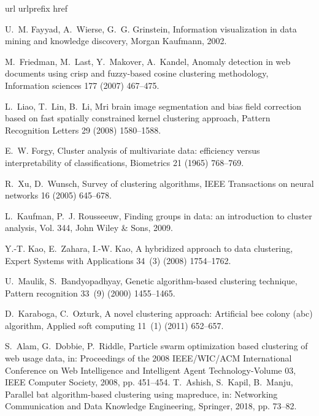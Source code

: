 \documentclass[review]{elsarticle}
\begin{document}

\begin{thebibliography}{10}
\expandafter\ifx\csname url\endcsname\relax
  \def\url#1{\texttt{#1}}\fi
\expandafter\ifx\csname urlprefix\endcsname\relax\def\urlprefix{URL }\fi
\expandafter\ifx\csname href\endcsname\relax
  \def\href#1#2{#2} \def\path#1{#1}\fi

U.~M. Fayyad, A.~Wierse, G.~G. Grinstein, Information visualization in data
  mining and knowledge discovery, Morgan Kaufmann, 2002.

M.~Friedman, M.~Last, Y.~Makover, A.~Kandel, Anomaly detection in web documents
  using crisp and fuzzy-based cosine clustering methodology, Information
  sciences 177 (2007) 467--475.

L.~Liao, T.~Lin, B.~Li, Mri brain image segmentation and bias field correction
  based on fast spatially constrained kernel clustering approach, Pattern
  Recognition Letters 29 (2008) 1580--1588.

E.~W. Forgy, Cluster analysis of multivariate data: efficiency versus
  interpretability of classifications, Biometrics 21 (1965) 768--769.

R.~Xu, D.~Wunsch, Survey of clustering algorithms, IEEE Transactions on neural
  networks 16 (2005) 645--678.

L.~Kaufman, P.~J. Rousseeuw, Finding groups in data: an introduction to cluster
  analysis, Vol. 344, John Wiley \& Sons, 2009.

Y.-T. Kao, E.~Zahara, I.-W. Kao, A hybridized approach to data clustering,
  Expert Systems with Applications 34~(3) (2008) 1754--1762.

U.~Maulik, S.~Bandyopadhyay, Genetic algorithm-based clustering technique,
  Pattern recognition 33~(9) (2000) 1455--1465.

D.~Karaboga, C.~Ozturk, A novel clustering approach: Artificial bee colony
  (abc) algorithm, Applied soft computing 11~(1) (2011) 652--657.

S.~Alam, G.~Dobbie, P.~Riddle, Particle swarm optimization based clustering of
  web usage data, in: Proceedings of the 2008 IEEE/WIC/ACM International
  Conference on Web Intelligence and Intelligent Agent Technology-Volume 03,
  IEEE Computer Society, 2008, pp. 451--454.
T.~Ashish, S.~Kapil, B.~Manju, Parallel bat algorithm-based clustering using
  mapreduce, in: Networking Communication and Data Knowledge Engineering,
  Springer, 2018, pp. 73--82.


\end{thebibliography}
\end{document}
